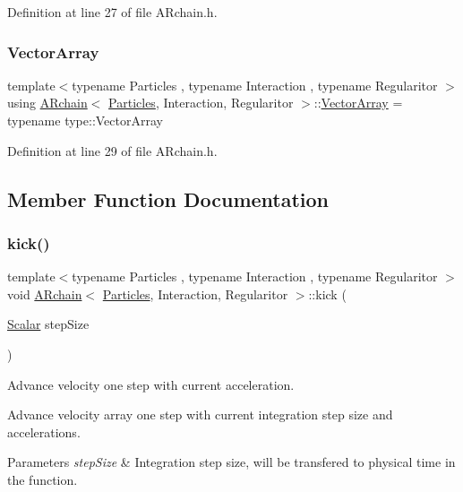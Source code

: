 Definition at line 27 of file A\+Rchain.\+h.

\mbox{\label{class_a_rchain_a94de7c4b88207f08c7b517736385d9f2}} 
\subsubsection{\texorpdfstring{Vector\+Array}{VectorArray}}
{\footnotesize\ttfamily template$<$typename Particles , typename Interaction , typename Regularitor $>$ \\
using \mbox{\hyperlink{class_a_rchain}{A\+Rchain}}$<$ \mbox{\hyperlink{struct_particles}{Particles}}, Interaction, Regularitor $>$\+::\mbox{\hyperlink{class_a_rchain_a94de7c4b88207f08c7b517736385d9f2}{Vector\+Array}} =  typename type\+::\+Vector\+Array}



Definition at line 29 of file A\+Rchain.\+h.



\subsection{Member Function Documentation}
\mbox{\label{class_a_rchain_a2def151c2de7790ebb1696dddac623e3}} 
\subsubsection{\texorpdfstring{kick()}{kick()}}
{\footnotesize\ttfamily template$<$typename Particles , typename Interaction , typename Regularitor $>$ \\
void \mbox{\hyperlink{class_a_rchain}{A\+Rchain}}$<$ \mbox{\hyperlink{struct_particles}{Particles}}, Interaction, Regularitor $>$\+::kick (\begin{DoxyParamCaption}\item[{\mbox{\hyperlink{class_a_rchain_a048c8855064f452c7d6d061531a084ed}{Scalar}}}]{step\+Size }\end{DoxyParamCaption})\hspace{0.3cm}{\ttfamily [inline]}}



Advance velocity one step with current acceleration. 

Advance velocity array one step with current integration step size and accelerations. 
\begin{DoxyParams}{Parameters}
{\em step\+Size} & Integration step size, will be transfered to physical time in the function. \\
\hline
\end{DoxyParams}



